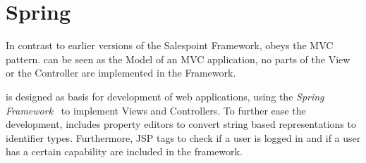 \section{Spring}
\label{spring}
In contrast to earlier versions of the Salespoint Framework, \salespoint{} obeys the MVC pattern. 
\salespoint{} can be seen as the Model of an MVC application, no parts of the View or the Controller are implemented in the Framework.

\salespoint{} is designed as basis for development of web applications, using the \textit{Spring Framework}~\cite{spring} to implement Views and Controllers.
To further ease the development, \salespoint{} includes property editors to convert string based representations to \salespoint{} identifier types.
Furthermore, JSP tags to check if a user is logged in and if a user has a certain capability are included in the framework.
